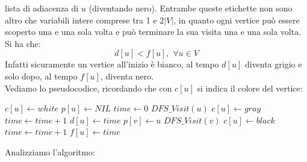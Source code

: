 \documentclass[a4paper,12pt, oneside]{book}
\begin{document}
lista di adiacenza di $u$ (diventando nero). Entrambe queste etichette
non sono altro che variabili intere comprese tra 1 e $2|V|$, in quanto
ogni vertice può essere scoperto una e una sola volta e può terminare
la sua visita una e una sola volta. Si ha che:
\[d[u]<f[u],\,\,\forall u\in V\]
Infatti sicuramente un vertice all'inizio è bianco, al tempo $d[u]$
diventa grigio e solo dopo, al tempo $f[u]$, diventa nero.\\
Vediamo lo pseudocodice, ricordando che con $c[u]$ si indica il colore
del vertice:
\begin{algorithm}[H]
  \begin{algorithmic}[1]
    \State $c[u]\gets white$
    \State $p[u]\gets NIL$
    \EndFor
    \State $time \gets 0$
    \State $DFS\_Visit(u)$
    \EndIf
    \EndFor
    \EndFunction
    \State
    \State $c[u] \gets gray$
    \State $time \gets time +1$
    \State $d[u] \gets time$
    \State $p[v] \gets u$
    \State $DFS\_Visit(v)$
    \EndIf
    \EndFor
    \State $c[u] \gets black$
    \State $time \gets time +1$
    \State $f[u] \gets time$
    \EndFunction
  \end{algorithmic}
\end{algorithm}
Analizziamo l'algoritmo:
\end{document}
